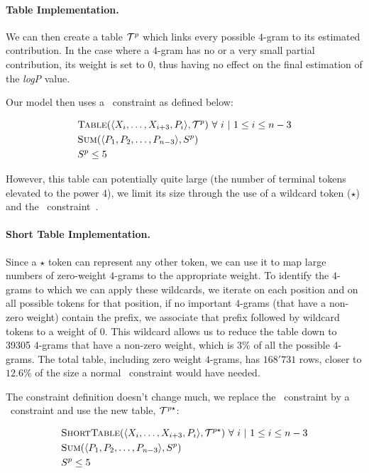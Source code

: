 \documentclass[../Document.tex]{subfiles}
\begin{document}
\paragraph{Table Implementation.}
We can then create a table ${\cal T}^p$ which links every possible $4$-gram to its estimated contribution.
In the case where a $4$-gram has no or a very small partial contribution, its weight is set to 0, thus having no effect on the final estimation of the \emph{logP} value.

Our model then uses a \extensional\ constraint as defined below:

\begin{align*}
    &\mbox{\sc Table}(\langle X_i,\ldots,X_{i+3},P_i\rangle, {\cal T}^p)\ \forall\ i\ \vert\ 1 \leq i \leq n-3 \\
    &\mbox{\sc Sum}(\langle P_1, P_2,\ldots,P_{n-3} \rangle, S^p)\\
    &S^p \leq 5
\end{align*}

However, this table can potentially quite large (the number of terminal tokens elevated to the power 4), we limit its size through the use of a wildcard token ($\star$) and the \shortTable\ constraint~\cite{DBLP:conf/aaai/VerhaegheLS17}.

\paragraph{Short Table Implementation.}
Since a $\star$ token can represent any other token, we can use it to map large numbers of zero-weight $4$-grams to the appropriate weight.
To identify the $4$-grams to which we can apply these wildcards, we iterate on each position and on all possible tokens for that position, if no important $4$-grams (that have a non-zero weight) contain the prefix, we associate that prefix followed by wildcard tokens to a weight of 0.
This wildcard allows us to reduce the table down to 39305 $4$-grams that have a non-zero weight, which is 3\% of all the possible $4$-grams. The total table, including zero weight $4$-grams, has $168'731$ rows, closer to $12.6\%$ of the size a normal \extensional\ constraint would have needed.

The constraint definition doesn't change much, we replace the \extensional\ constraint by a\\ \shortTable\ constraint and use the new table, ${\cal T}^{p\star}$:

\begin{align*}
    &\mbox{\sc ShortTable}(\langle X_i,\ldots,X_{i+3},P_i\rangle, {\cal T}^{p\star})\ \forall\ i\ \vert\ 1 \leq i \leq n-3 \\
    &\mbox{\sc Sum}(\langle P_1, P_2,\ldots,P_{n-3} \rangle, S^p)\\
    &S^p \leq 5
\end{align*}
\end{document}
